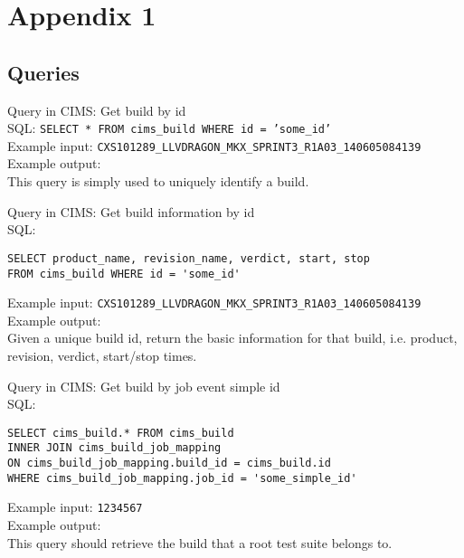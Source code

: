 \appendix
\chapter{Appendix 1}
\label{appendix1}
\section{Queries}
\label{relationalqueries}
\label{q:getbuild}
Query in CIMS: Get build by id \\
SQL: {\tt SELECT * FROM cims\_build WHERE id = 'some\_id'} \\
Example input: {\tt CXS101289\_LLVDRAGON\_MKX\_SPRINT3\_R1A03\_140605084139 } \\
Example output: \\
This query is simply used to uniquely identify a build.

\label{q:getbuildinfo}
Query in CIMS: Get build information by id \\
SQL: 
\begin{verbatim}
SELECT product_name, revision_name, verdict, start, stop
FROM cims_build WHERE id = 'some_id'
\end{verbatim}
Example input: {\tt CXS101289\_LLVDRAGON\_MKX\_SPRINT3\_R1A03\_140605084139 }  \\
Example output: \\
Given a unique build id, return the basic information for that build, i.e. product, revision, verdict, start/stop times.

\label{q:getbuildforroot}
Query in CIMS: Get build by job event simple id \\
SQL: 
\begin{verbatim}
SELECT cims_build.* FROM cims_build
INNER JOIN cims_build_job_mapping
ON cims_build_job_mapping.build_id = cims_build.id   
WHERE cims_build_job_mapping.job_id = 'some_simple_id'
\end{verbatim} 
Example input: {\tt 1234567 }  \\
Example output: \\
This query should retrieve the build that a root test suite belongs to.


